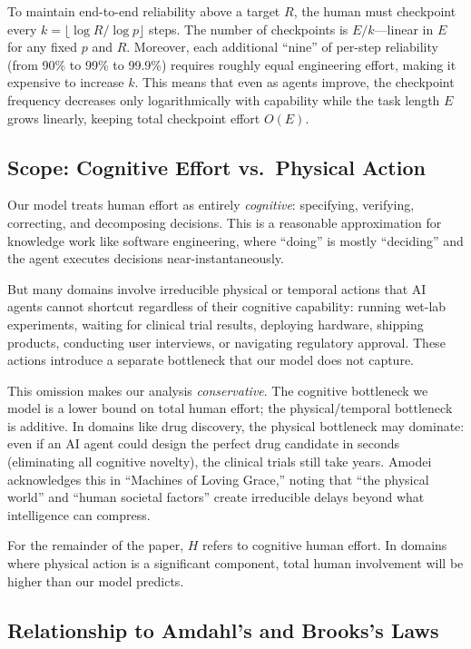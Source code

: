 \documentclass[11pt,a4paper]{article}
\begin{document}
To maintain end-to-end reliability above a target $R$, the human must checkpoint every $k = \lfloor \log R / \log p \rfloor$ steps. The number of checkpoints is $E/k$---linear in $E$ for any fixed $p$ and $R$. Moreover, each additional ``nine'' of per-step reliability (from 90\% to 99\% to 99.9\%) requires roughly equal engineering effort, making it expensive to increase $k$. This means that even as agents improve, the checkpoint frequency decreases only logarithmically with capability while the task length $E$ grows linearly, keeping total checkpoint effort $O(E)$.

\subsection{Scope: Cognitive Effort vs.\ Physical Action}
\label{sec:scope}

Our model treats human effort as entirely \emph{cognitive}: specifying, verifying, correcting, and decomposing decisions. This is a reasonable approximation for knowledge work like software engineering, where ``doing'' is mostly ``deciding'' and the agent executes decisions near-instantaneously.

But many domains involve irreducible physical or temporal actions that AI agents cannot shortcut regardless of their cognitive capability: running wet-lab experiments, waiting for clinical trial results, deploying hardware, shipping products, conducting user interviews, or navigating regulatory approval. These actions introduce a separate bottleneck that our model does not capture.

This omission makes our analysis \emph{conservative}. The cognitive bottleneck we model is a lower bound on total human effort; the physical/temporal bottleneck is additive. In domains like drug discovery, the physical bottleneck may dominate: even if an AI agent could design the perfect drug candidate in seconds (eliminating all cognitive novelty), the clinical trials still take years. Amodei acknowledges this in ``Machines of Loving Grace,'' noting that ``the physical world'' and ``human societal factors'' create irreducible delays beyond what intelligence can compress.

For the remainder of the paper, $H$ refers to cognitive human effort. In domains where physical action is a significant component, total human involvement will be higher than our model predicts.

\subsection{Relationship to Amdahl's and Brooks's Laws}
\label{sec:amdahl}
\end{document}

